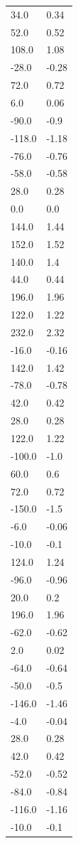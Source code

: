 \begin{longtable}{ll}
34.0 & 0.34 \\
52.0 & 0.52 \\
108.0 & 1.08 \\
-28.0 & -0.28 \\
72.0 & 0.72 \\
6.0 & 0.06 \\
-90.0 & -0.9 \\
-118.0 & -1.18 \\
-76.0 & -0.76 \\
-58.0 & -0.58 \\
28.0 & 0.28 \\
0.0 & 0.0 \\
144.0 & 1.44 \\
152.0 & 1.52 \\
140.0 & 1.4 \\
44.0 & 0.44 \\
196.0 & 1.96 \\
122.0 & 1.22 \\
232.0 & 2.32 \\
-16.0 & -0.16 \\
142.0 & 1.42 \\
-78.0 & -0.78 \\
42.0 & 0.42 \\
28.0 & 0.28 \\
122.0 & 1.22 \\
-100.0 & -1.0 \\
60.0 & 0.6 \\
72.0 & 0.72 \\
-150.0 & -1.5 \\
-6.0 & -0.06 \\
-10.0 & -0.1 \\
124.0 & 1.24 \\
-96.0 & -0.96 \\
20.0 & 0.2 \\
196.0 & 1.96 \\
-62.0 & -0.62 \\
2.0 & 0.02 \\
-64.0 & -0.64 \\
-50.0 & -0.5 \\
-146.0 & -1.46 \\
-4.0 & -0.04 \\
28.0 & 0.28 \\
42.0 & 0.42 \\
-52.0 & -0.52 \\
-84.0 & -0.84 \\
-116.0 & -1.16 \\
-10.0 & -0.1 \\

\end{longtable}
